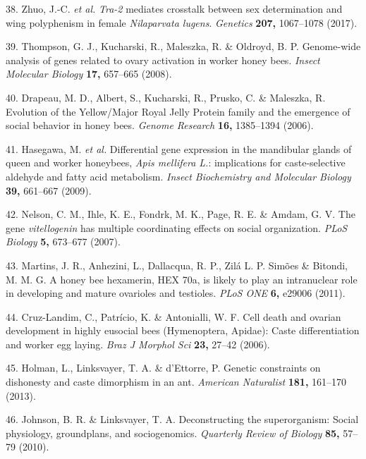 \documentclass[12pt,]{article}
\begin{document}
\hypertarget{ref-zhuo2017tra}{}
38. Zhuo, J.-C. \emph{et al.} \emph{Tra-2} mediates crosstalk between
sex determination and wing polyphenism in female \emph{Nilaparvata
lugens}. \emph{Genetics} \textbf{207,} 1067--1078 (2017).

\hypertarget{ref-thompson2008ge}{}
39. Thompson, G. J., Kucharski, R., Maleszka, R. \& Oldroyd, B. P.
Genome-wide analysis of genes related to ovary activation in worker
honey bees. \emph{Insect Molecular Biology} \textbf{17,} 657--665
(2008).

\hypertarget{ref-Drapeau:2006jt}{}
40. Drapeau, M. D., Albert, S., Kucharski, R., Prusko, C. \& Maleszka,
R. Evolution of the Yellow/Major Royal Jelly Protein family and the
emergence of social behavior in honey bees. \emph{Genome Research}
\textbf{16,} 1385--1394 (2006).

\hypertarget{ref-hasegawa2009di}{}
41. Hasegawa, M. \emph{et al.} Differential gene expression in the
mandibular glands of queen and worker honeybees, \emph{Apis mellifera
L.}: implications for caste-selective aldehyde and fatty acid
metabolism. \emph{Insect Biochemistry and Molecular Biology}
\textbf{39,} 661--667 (2009).

\hypertarget{ref-Nelson:2007fz}{}
42. Nelson, C. M., Ihle, K. E., Fondrk, M. K., Page, R. E. \& Amdam, G.
V. The gene \emph{vitellogenin} has multiple coordinating effects on
social organization. \emph{PLoS Biology} \textbf{5,} 673--677 (2007).

\hypertarget{ref-Martins:2011co}{}
43. Martins, J. R., Anhezini, L., Dallacqua, R. P., Zilá L. P. Simões \&
Bitondi, M. M. G. A honey bee hexamerin, HEX 70a, is likely to play an
intranuclear role in developing and mature ovarioles and testioles.
\emph{PLoS ONE} \textbf{6,} e29006 (2011).

\hypertarget{ref-CruzLandim:2006uz}{}
44. Cruz-Landim, C., Patrício, K. \& Antonialli, W. F. Cell death and
ovarian development in highly eusocial bees (Hymenoptera, Apidae): Caste
differentiation and worker egg laying. \emph{Braz J Morphol Sci}
\textbf{23,} 27--42 (2006).

\hypertarget{ref-Holman:2013iy}{}
45. Holman, L., Linksvayer, T. A. \& d'Ettorre, P. Genetic constraints
on dishonesty and caste dimorphism in an ant. \emph{American Naturalist}
\textbf{181,} 161--170 (2013).

\hypertarget{ref-johnson2010de}{}
46. Johnson, B. R. \& Linksvayer, T. A. Deconstructing the
superorganism: Social physiology, groundplans, and sociogenomics.
\emph{Quarterly Review of Biology} \textbf{85,} 57--79 (2010).
\end{document}
